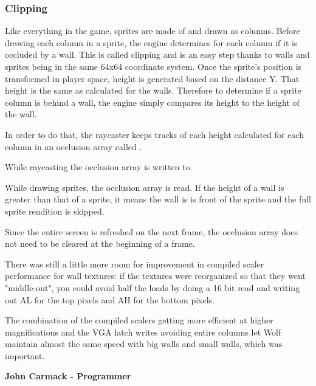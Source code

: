 \subsubsection{Clipping}
Like everything in the game, sprites are made of and drawn as columns. Before drawing each column in a sprite, the engine determines for each column if it is occluded by a wall. This is called clipping and is an easy step thanks to walls and sprites being in the same 64x64 coordinate system. Once the sprite's position is transformed in player space, height is generated based on the distance Y. That height is the same as calculated for the walls. Therefore to determine if a sprite column is behind a wall, the engine simply compares its height to the height of the wall.\\
\par
In order to do that, the raycaster keeps tracks of each height calculated for each column in an occlusion array called .\\
\par
\begin{minipage}{\textwidth}

\end{minipage}
\par
While raycasting the occlusion array is written to.\\
\par
\begin{minipage}{\textwidth}

\end{minipage}
While drawing sprites, the occlusion array is read. If the height of a wall is greater than that of a sprite, it means the wall is is front of the sprite and the full sprite rendition is skipped.\\
\par
\begin{minipage}{\textwidth}

\end{minipage}
\par
Since the entire screen is refreshed on the next frame, the occlusion array does not need to be cleared at the beginning of a frame.\\


\begin{fancyquotes}
There was still a little more room for improvement in compiled scaler performance for wall textures:  if the textures were reorganized so that they went "middle-out", you could avoid half the loads by doing a 16 bit read and writing out AL for the top pixels and AH for the bottom pixels.\\
\par 
The combination of the compiled scalers getting more efficient at higher magnifications and the VGA latch writes avoiding entire columns let Wolf maintain almost the same speed with big walls and small walls, which was important.\\
\par
\textbf{John Carmack - Programmer}
 \end{fancyquotes}


